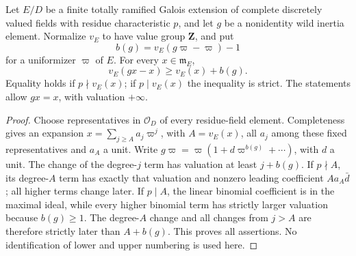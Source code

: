 \begin{lemma}
\label{lem:B-RD60-break}
Let $E/D$ be a finite totally ramified Galois extension of complete
discretely valued fields with residue characteristic $p$, and let
$g$ be a nonidentity wild inertia element. Normalize $v_E$ to have
value group $\mathbf Z$, and put
\[
       b(g)=v_E(g\varpi-\varpi)-1
\]
for a uniformizer $\varpi$ of $E$. For every $x\in\mathfrak m_E$,
\[
 v_E(gx-x)\ge v_E(x)+b(g).                              \tag{B-RD60.2}
\]
Equality holds if $p\nmid v_E(x)$; if $p\mid v_E(x)$ the inequality
is strict. The statements allow $gx=x$, with valuation $+\infty$.
\end{lemma}
\begin{proof}
Choose representatives in $\mathcal O_D$ of every residue-field
element. Completeness gives an expansion
$x=\sum_{j\ge A}a_j\varpi^j$, with $A=v_E(x)$, all $a_j$ among
these fixed representatives and $a_A$ a unit. Write
$g\varpi=\varpi(1+d\varpi^{b(g)}+\cdots)$, with $d$ a unit.
The change of the degree-$j$ term has valuation at least $j+b(g)$.
If $p\nmid A$, its degree-$A$ term has exactly that valuation and
nonzero leading coefficient $Aa_A\bar d$; all higher terms change
later. If $p\mid A$, the linear binomial coefficient is in the
maximal ideal, while every higher binomial term has strictly larger
valuation because $b(g)\ge1$. The degree-$A$ change and all changes
from $j>A$ are therefore strictly later than $A+b(g)$. This proves
all assertions. No identification of lower and upper numbering is
used here.
\end{proof}

